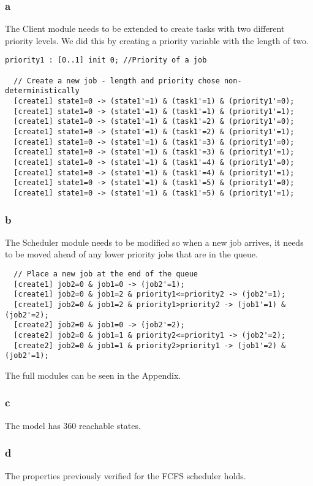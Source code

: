 \subsubsection{a}

The Client module needs to be extended to create tasks with two different priority levels. We did this
by creating a priority variable with the length of two.

\begin{verbatim}
priority1 : [0..1] init 0; //Priority of a job
  
  // Create a new job - length and priority chose non-deterministically
  [create1] state1=0 -> (state1'=1) & (task1'=1) & (priority1'=0);
  [create1] state1=0 -> (state1'=1) & (task1'=1) & (priority1'=1);
  [create1] state1=0 -> (state1'=1) & (task1'=2) & (priority1'=0);
  [create1] state1=0 -> (state1'=1) & (task1'=2) & (priority1'=1);
  [create1] state1=0 -> (state1'=1) & (task1'=3) & (priority1'=0);
  [create1] state1=0 -> (state1'=1) & (task1'=3) & (priority1'=1);
  [create1] state1=0 -> (state1'=1) & (task1'=4) & (priority1'=0);
  [create1] state1=0 -> (state1'=1) & (task1'=4) & (priority1'=1);
  [create1] state1=0 -> (state1'=1) & (task1'=5) & (priority1'=0);
  [create1] state1=0 -> (state1'=1) & (task1'=5) & (priority1'=1);
\end{verbatim}

\subsubsection{b}

The Scheduler module needs to be modified so when a new job arrives, it needs to be moved ahead
of any lower priority jobs that are in the queue.

\begin{verbatim}
  // Place a new job at the end of the queue
  [create1] job2=0 & job1=0 -> (job2'=1);
  [create1] job2=0 & job1=2 & priority1<=priority2 -> (job2'=1);
  [create1] job2=0 & job1=2 & priority1>priority2 -> (job1'=1) & (job2'=2);
  [create2] job2=0 & job1=0 -> (job2'=2);
  [create2] job2=0 & job1=1 & priority2<=priority1 -> (job2'=2);
  [create2] job2=0 & job1=1 & priority2>priority1 -> (job1'=2) & (job2'=1);
\end{verbatim}

The full modules can be seen in the Appendix.

\subsubsection{c}

The model has 360 reachable states.

\subsubsection{d}

The properties previously verified for the FCFS scheduler holds.